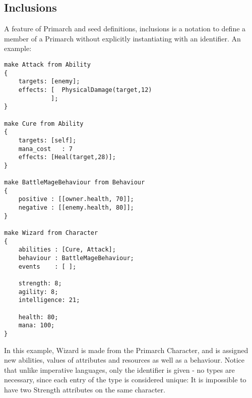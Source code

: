 \subsection{Inclusions}
A feature of Primarch and seed definitions, inclusions is a notation to define a member of a Primarch without explicitly instantiating with an identifier. An example:
\begin{lstlisting}[language=fflang]
make Attack from Ability
{
	targets: [enemy];
	effects: [	PhysicalDamage(target,12)
			 ];
}

make Cure from Ability
{
	targets: [self];
	mana_cost   : 7
	effects: [Heal(target,28)];
}

make BattleMageBehaviour from Behaviour
{
	positive : [[owner.health, 70]];
	negative : [[enemy.health, 80]];
}

make Wizard from Character
{
	abilities : [Cure, Attack];
	behaviour : BattleMageBehaviour;
	events    : [ ];
                 
    strength: 8;
    agility: 8;
    intelligence: 21;
    
    health: 80;
    mana: 100;
}
\end{lstlisting}

In this example, Wizard is made from the Primarch Character, and is assigned new abilities, values of attributes and resources as well as a behaviour. Notice that unlike imperative languages, only the identifier is given - no types are necessary, since each entry of the type is considered unique: It is impossible to have two Strength attributes on the same character.